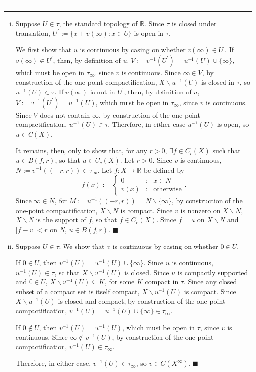 \documentclass[11pt]{article}
\newcounter{questionCounter}
\newcounter{partCounter}[questionCounter]
\newenvironment{question}[2][\arabic{questionCounter}]{%
    \setcounter{partCounter}{0}%
    \vspace{.25in} \hrule \vspace{0.5em}%
        \noindent{\bf #2}%
    \vspace{0.8em} \hrule \vspace{.10in}%
    \addtocounter{questionCounter}{1}%
}{}
\renewcommand{\qed}{\quad $\blacksquare$}
\newcommand{\inv}{^{-1}}
\newcommand{\sminus}{\backslash}
\newcommand{\R}{\mathbb{R}} %
\begin{document}
\begin{question}{Problem 6}
\begin{enumerate}[(i)]
\item Suppose $U \in \tau$, the standard topology of $\R$. Since $\tau$ is
closed under translation, $U^{\prime} := \{x + v(\infty) : x \in U\}$ is open
in $\tau$.

We first show that $u$ is continuous by casing on whether
$v(\infty) \in U^{\prime}$.
If $v(\infty) \in U^{\prime}$, then, by definition of $u$,
$V := v\inv(U^{\prime}) = u\inv(U) \cup \{\infty\}$, which must be open in
$\tau_{\infty}$, since $v$ is continuous. Since $\infty \in V$, by
construction of the one-point compactification, $X \sminus u\inv(U)$ is closed
in $\tau$, so $u\inv(U) \in \tau$.
If $v(\infty)$ is not in $U^{\prime}$, then, by definition of $u$,
$V := v\inv(U^{\prime}) = u\inv(U)$, which must be open in $\tau_{\infty}$,
since $v$ is continuous. Since $V$ does not contain $\infty$, by construction
of the one-point compactification, $u\inv(U) \in \tau$.
Therefore, in either case $u\inv(U)$ is open, so $u \in C(X)$.

It remains, then, only to show that, for any $r > 0$, $\exists f \in C_c(X)$
such that $u \in B(f,r)$, so that $u \in \overline{C_c(X)}$. Let $r > 0$.
Since $v$ is continuous, $N := v\inv((-r,r)) \in \tau_{\infty}$. Let
$f: X \rightarrow \R$ be defined by
\[f(x) :=   \left\{
                \begin{array}{lcr}
                    0       & : & x \in N           \\
                    v(x)    & : & \mbox{otherwise}
                \end{array}
            \right..
\]
Since $\infty \in N$, for $M := u\inv((-r,r)) = N \sminus \{\infty\}$, by
construction of the one-point compactification, $X \sminus N$ is compact.
Since $v$ is nonzero on $X \sminus N$, $X \sminus N$ is the support of $f$,
so that $f \in C_c(X)$. Since $f = u$ on $X \sminus N$ and $|f - u| < r$ on
$N$, $u \in B(f,r).$ \qed

\item Suppose $U \in \tau$. We show that $v$ is continuous by casing on
whether $0 \in U$.

If $0 \in U$, then $v\inv(U) = u\inv(U) \cup \{\infty\}$. Since $u$ is
continuous, $u\inv(U) \in \tau$, so that $X \sminus u\inv(U)$ is closed.
Since $u$ is compactly supported and $0 \in U$,
$X \sminus u\inv(U) \subseteq K$, for some $K$ compact in $\tau$. Since any
closed subset of a compact set is itself compact, $X \sminus u\inv(U)$ is
compact. Since $X \sminus u\inv(U)$ is closed and compact, by construction of
the one-point compactification,
$v\inv(U) = u\inv(U) \cup\{\infty\} \in \tau_{\infty}$.

If $0 \notin U$, then $v\inv(U) = u\inv(U)$, which must be open in
$\tau$, since $u$ is continuous. Since $\infty \notin v\inv(U)$, by
construction of the one-point compactification, $v\inv(U) \in \tau_{\infty}$.

Therefore, in either case, $v\inv(U) \in \tau_{\infty}$, so
$v \in C(X^{\infty})$. \qed
\end{enumerate}
\end{question}
\end{document}
